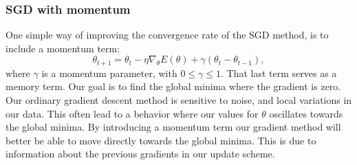 \subsubsection{SGD with momentum}
One simple way of improving the convergence rate of the SGD method, is to
include a momentum term: 
\begin{equation*}
    \theta _{t+1} = \theta _t - \eta \nabla_\theta E(\theta )+\gamma (\theta_t
    -\theta_{t-1}     ) ,
\end{equation*}
where $\gamma $ is a momentum parameter, with $0\leq \gamma \leq1$. That last
term serves as a memory term. Our goal is to find the
global minima where the gradient is zero. Our ordinary gradient descent method
is sensitive to noise, and local variations in our data.
This often lead to a behavior where our values for $\theta $ oscillates
towards the global minima. %
By introducing a momentum term our gradient method will better be able to move
directly towards the global minima. This is due to information about the previous
gradients in our update scheme.     

